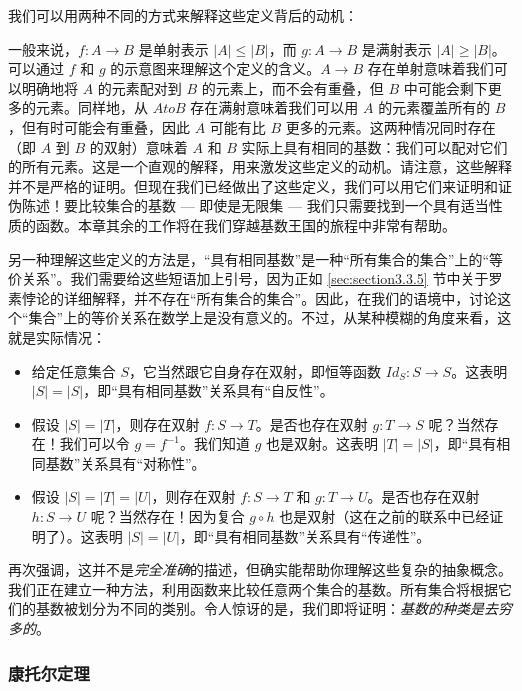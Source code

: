 我们可以用两种不同的方式来解释这些定义背后的动机：

一般来说，$f : A \to B$ 是单射表示 $|A| \le |B|$，而 $g : A \to B$ 是满射表示 $|A| \ge |B|$。可以通过 $f$ 和 $g$ 的示意图来理解这个定义的含义。$A \to B$ 存在单射意味着我们可以明确地将 $A$ 的元素配对到 $B$ 的元素上，而不会有重叠，但 $B$ 中可能会剩下更多的元素。同样地，从 $A to B$ 存在满射意味着我们可以用 $A$ 的元素覆盖所有的 $B$，但有时可能会有重叠，因此 $A$ 可能有比 $B$ 更多的元素。这两种情况同时存在（即 $A$ 到 $B$ 的双射）意味着 $A$ 和 $B$ 实际上具有相同的基数：我们可以配对它们的所有元素。这是一个直观的解释，用来激发这些定义的动机。请注意，这些解释并不是严格的证明。但现在我们已经做出了这些定义，我们可以用它们来证明和证伪陈述！要比较集合的基数 --- 即使是无限集 --- 我们只需要找到一个具有适当性质的函数。本章其余的工作将在我们穿越基数王国的旅程中非常有帮助。

另一种理解这些定义的方法是，``具有相同基数''是一种``所有集合的集合''上的``等价关系''。我们需要给这些短语加上引号，因为正如 \ref{sec:section3.3.5} 节中关于罗素悖论的详细解释，并不存在``所有集合的集合''。因此，在我们的语境中，讨论这个``集合''上的等价关系在数学上是没有意义的。不过，从某种模糊的角度来看，这就是实际情况：

\begin{itemize}
    \item 给定任意集合 $S$，它当然跟它自身存在双射，即恒等函数 $Id_S : S \to S$。这表明 $|S|=|S|$，即``具有相同基数''关系具有``自反性''。
    \item 假设 $|S| = |T|$，则存在双射 $f:S \to T$。是否也存在双射 $g : T \to S$ 呢？当然存在！我们可以令 $g=f^{-1}$。我们知道 $g$ 也是双射。这表明 $|T| = |S|$，即``具有相同基数''关系具有``对称性''。
    \item 假设 $|S| = |T| = |U|$，则存在双射 $f : S \to T$ 和 $g : T \to U$。是否也存在双射 $h : S \to U$ 呢？当然存在！因为复合 $g \circ h$ 也是双射（这在之前的联系中已经证明了）。这表明 $|S| = |U|$，即``具有相同基数''关系具有``传递性''。
\end{itemize}

再次强调，这并不是\emph{完全准确}的描述，但确实能帮助你理解这些复杂的抽象概念。我们正在建立一种方法，利用函数来比较任意两个集合的基数。所有集合将根据它们的基数被划分为不同的类别。令人惊讶的是，我们即将证明：\emph{基数的种类是去穷多的}。

\subsubsection*{康托尔定理}

